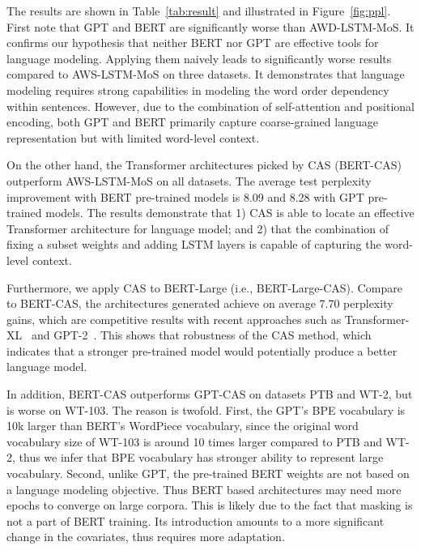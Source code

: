 \documentclass[11pt,a4paper]{article}
\begin{document}
The results are shown in Table~\ref{tab:result} and illustrated in
Figure~\ref{fig:ppl}. First note that GPT and BERT are significantly
worse than AWD-LSTM-MoS. It confirms our hypothesis that neither BERT
nor GPT are effective tools for language modeling. Applying them
naively leads to significantly worse results compared to AWS-LSTM-MoS
on three datasets. It demonstrates that language modeling requires
strong capabilities in modeling the word order dependency within
sentences. However, due to the combination of self-attention and
positional encoding, both GPT and BERT primarily capture
coarse-grained language representation but with limited word-level
context.

On the other hand, the Transformer architectures picked by CAS (BERT-CAS)
outperform AWS-LSTM-MoS on all datasets. The average test perplexity
improvement with BERT pre-trained models is 8.09 and 8.28 with GPT
pre-trained models. The results demonstrate that 1) CAS is able to
locate an effective Transformer architecture for language model; and
2) that the combination of fixing a subset weights and adding LSTM
layers is capable of capturing the word-level context.


Furthermore, we apply CAS to BERT-Large (i.e., BERT-Large-CAS). Compare to BERT-CAS, the architectures generated achieve on average 7.70 perplexity gains, which are competitive results with recent approaches such as Transformer-XL~\cite{dai2019transformer} and GPT-2~\cite{radford2019language}. This shows that robustness of the CAS method, which indicates that a stronger pre-trained model would potentially produce a better language model.

In addition, BERT-CAS outperforms GPT-CAS on datasets PTB and WT-2, but is worse on WT-103. The reason is twofold. First, the GPT's BPE vocabulary is 10k larger than BERT's WordPiece vocabulary, since the original word vocabulary size of WT-103 is around 10 times larger compared to PTB and WT-2, thus we infer that BPE vocabulary has stronger ability to represent large vocabulary. Second, unlike GPT, the pre-trained BERT weights are not based on a language modeling objective. Thus BERT based architectures may need more epochs to converge on large corpora. This is likely due to the fact that masking is not a part of BERT training. Its introduction amounts to a more significant change in the covariates, thus requires more adaptation.
\end{document}
